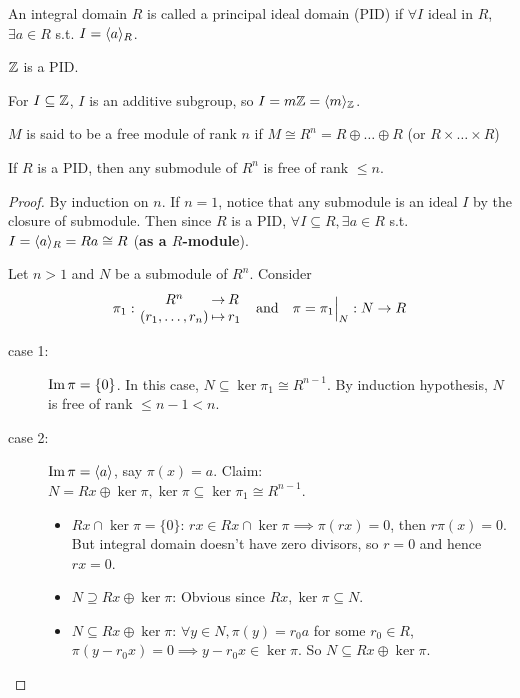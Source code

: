 \begin{definition}
  An integral domain $R$ is called a principal ideal domain (PID)
  if $\forall I$ ideal in $R$, $\exists a \in R$ s.t. $I = \langle a\rangle_R$.
\end{definition}

\begin{example}
  $\mathbb{Z}$ is a PID.

  For $I \subseteq \mathbb{Z}$, $I$ is an additive subgroup, so
  $I = m\mathbb{Z} = \langle m\rangle_{\mathbb{Z}}$.
\end{example}

\begin{definition}
  $M$ is said to be a free module of rank $n$ if
  $M \cong R^n = R \oplus \dots \oplus R$ (or $R \times \dots \times R$)
\end{definition}

\begin{theorem}
  If $R$ is a PID, then any submodule of $R^n$ is free of rank $\le n$.
  \begin{proof}
    By induction on $n$. If $n = 1$, notice that any submodule is an ideal $I$ by 
    the closure of submodule. Then since $R$ is a PID,
    $\forall I \subseteq R, \exists a \in R$ s.t.
    $I = \langle a\rangle_R = Ra \cong R$ ({\bf as a $R$-module}).

    Let $n > 1$ and $N$ be a submodule of $R^n$.
    Consider
    \[\arraycolsep=1pt
      \pi_1:
      \begin{array}{ccl}
        R^n & \to & R \\
        (r_1, \dots, r_n) & \mapsto & r_1
      \end{array}
      \quad \text{and} \quad
      \pi = \pi_1\Big|_N: N \to R
    \]
    \begin{description}
      \item[case 1:] $\operatorname{Im} \pi = \{0\}$. In this case,
        $N \subseteq \ker\pi_1 \cong R^{n-1}$.
        By induction hypothesis, $N$ is free of rank $\le n-1 < n$.
      \item[case 2:] $\operatorname{Im} \pi = \langle a\rangle$, say $\pi(x) = a$.
        Claim: $N = Rx \oplus \ker\pi,
        \ker \pi \subseteq \ker \pi_1 \cong R^{n-1}$.
        \begin{itemize}
          \item $Rx \cap \ker\pi = \{0\}$:
            $rx \in Rx \cap \ker\pi \implies \pi(rx) = 0$, then $r\pi(x) = 0$. 
            But integral domain doesn't have zero divisors, so $r = 0$ and hence
            $rx = 0$.
          \item $N \supseteq Rx \oplus \ker\pi$: Obvious since $Rx, \ker\pi \subseteq N$.
          \item $N \subseteq Rx \oplus \ker\pi$: $\forall y \in N, \pi(y) = r_0a $ for some $r_0 \in R$,
            $\pi(y - r_0x) = 0 \implies y - r_0x \in \ker\pi$.
            So $N \subseteq Rx \oplus \ker\pi$. \qedhere
        \end{itemize}
    \end{description}
  \end{proof}
\end{theorem}

